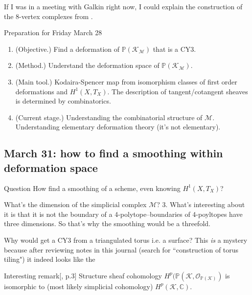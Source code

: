 If I was in a meeting with Galkin right now, I could explain the construction of the 8-vertex complexes from \cite{gru}.

\begin{thing8}{Preparation for Friday March 28}\leavevmode
\begin{enumerate}
\item (Objective.) Find a deformation of \(\mathbb{P}(\mathcal{K}_\mathcal{M})\) that is a CY3.
\item (Method.) Understand the deformation space of \(\mathbb{P}(\mathcal{K}_\mathcal{M})\).
\item (Main tool.) Kodaira-Spencer map from isomorphism classes of first order deformations and \(H^{1}(X,T_X)\). The description of tangent/cotangent sheaves is determined by combinatorics.
 \item (Current stage.) Understanding the combinatorial structure of \(\mathcal{M}\). Understanding elementary deformation theory (it's not elementary).
\end{enumerate}	
\end{thing8}

\subsection{March 31: how to find a smoothing within deformation space}

\begin{thing8}{Question}\leavevmode
How find a smoothing of a scheme, even knowing \(H^{1}(X,T_X)\)?
\end{thing8}

\begin{question}\leavevmode
What's the dimension of the simplicial complex \(\mathcal{M}\)? 3. What's interesting about it is that it is not the boundary of a 4-polytope--boundaries of 4-poyltopes have three dimensions. So that's why the smoothing would be a threefold.
\end{question}

\begin{question}\leavevmode
Why would \cite{jan1} get a CY3 from a triangulated torus i.e. a surface? This \textit{is} a mystery because after reviewing notes in this journal (search for ``construction of torus tiling") it indeed looks like the 
\end{question}

\begin{thing8}{Interesting remark}[\cite{jan1}, p.3]\leavevmode
Structure sheaf cohomology \(H^{p}(\mathbb{P}(\mathcal{K},\mathcal{O}_{\mathbb{P}(\mathcal{K})})\) is isomorphic to (most likely simplicial cohomology) \(H^{p}(\mathcal{K},\mathbb{C})\).
\end{thing8}

